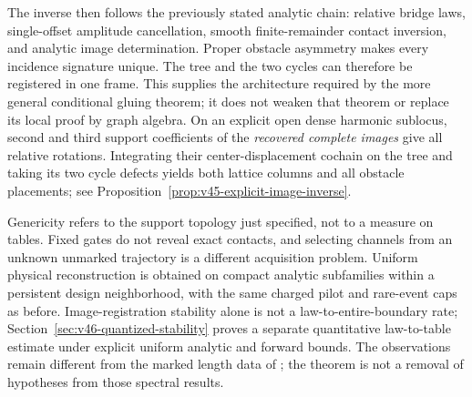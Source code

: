 The inverse then follows the previously stated analytic chain: relative
bridge laws, single-offset amplitude cancellation, smooth finite-remainder
contact inversion, and analytic image determination.  Proper obstacle
asymmetry makes every incidence signature unique.  The tree and the two
cycles can therefore be registered in one frame.  This supplies the
architecture required by the more general conditional gluing theorem; it
does not weaken that theorem or replace its local proof by graph algebra.
On an explicit open dense harmonic sublocus, second and third support
coefficients of the \emph{recovered complete images} give all relative
rotations.  Integrating their center-displacement cochain on the tree and
taking its two cycle defects yields both lattice columns and all obstacle
placements; see Proposition~\ref{prop:v45-explicit-image-inverse}.

Genericity refers to the support topology just specified, not to a measure
on tables.  Fixed gates do not reveal exact contacts, and selecting channels
from an unknown unmarked trajectory is a different acquisition problem.
Uniform physical reconstruction is obtained on compact analytic subfamilies
within a persistent design neighborhood, with the same charged pilot and
rare-event caps as before.  Image-registration stability alone is not a law-to-entire-boundary rate;
Section~\ref{sec:v46-quantized-stability} proves a separate quantitative
law-to-table estimate under explicit uniform analytic and forward bounds.  The observations remain different
from the marked length data of \cite{DSKL,FinamoreLeguil}; the theorem is
not a removal of hypotheses from those spectral results.
